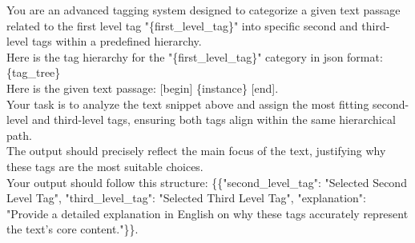\begin{tcolorbox}[title = {Prompt Template For Second-level And Third-level Tagging},breakable]
\label{second-level and third level tagging}
\small
You are an advanced tagging system designed to categorize a given text passage related to the first level tag "\{first\_level\_tag\}" into specific second and third-level tags within a predefined hierarchy. \\
    Here is the tag hierarchy for the "\{first\_level\_tag\}" category in json format: \{tag\_tree\} \\
    Here is the given text passage: [begin] \{instance\} [end]. \\
    Your task is to analyze the text snippet above and assign the most fitting second-level and third-level tags, ensuring both tags align within the same hierarchical path. \\
    The output should precisely reflect the main focus of the text, justifying why these tags are the most suitable choices. \\
    Your output should follow this structure: \{\{"second\_level\_tag": "Selected Second Level Tag", "third\_level\_tag": "Selected Third Level Tag", "explanation": "Provide a detailed explanation in English on why these tags accurately represent the text's core content."\}\}.
\end{tcolorbox}

